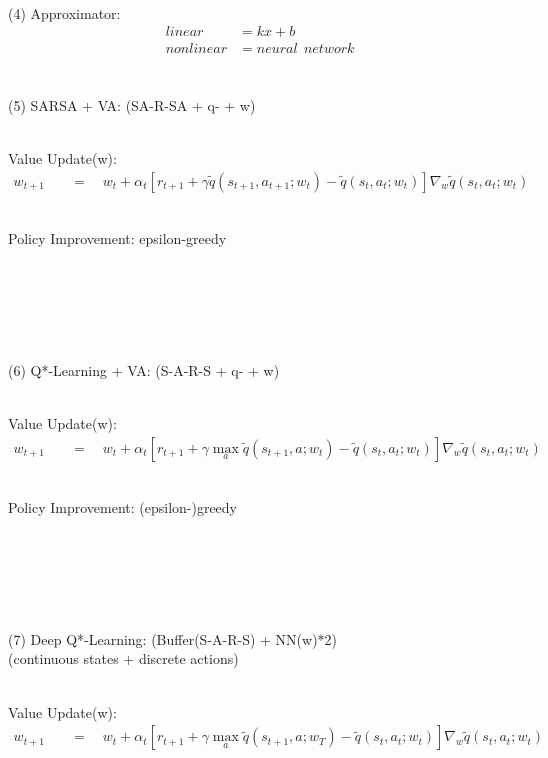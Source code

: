 \documentclass{article}
\begin{document}
~ \\[3pt]
(4) Approximator: 
\begin{align*}
    linear    &= kx + b \\[3pt]
    nonlinear &= neural \ \ network \\[3pt]
\end{align*}


\newpage


~ \\[3pt]
(5) SARSA + VA: \qquad (SA-R-SA + q- + w) 

~ \\[3pt]
Value Update(w): 
\begin{align*}
    w_{t+1} & 
            \quad = \quad w_{t} + \alpha_{t} 
            [ r_{t+1} + \gamma \tilde{q}(s_{t+1}, a_{t+1}; w_{t}) 
            - \tilde{q}(s_{t}, a_{t}; w_{t}) ] 
            \nabla_{w} \tilde{q}(s_{t}, a_{t}; w_{t}) 
\end{align*}

~ \\[3pt]
Policy Improvement: epsilon-greedy


~ \\[3pt]
~ \\[3pt]
~ \\[3pt]
~ \\[3pt]
~ \\[3pt]
(6) Q*-Learning + VA: \qquad (S-A-R-S + q- + w) 

~ \\[3pt]
Value Update(w): 
\begin{align*}
    w_{t+1} & 
            \quad = \quad w_{t} + \alpha_{t} 
            [ r_{t+1} + \gamma \max_{a} \tilde{q}(s_{t+1}, a; w_{t}) 
            - \tilde{q}(s_{t}, a_{t}; w_{t}) ] 
            \nabla_{w} \tilde{q}(s_{t}, a_{t}; w_{t}) 
\end{align*}

~ \\[3pt]
Policy Improvement: (epsilon-)greedy 


~ \\[3pt]
~ \\[3pt]
~ \\[3pt]
~ \\[3pt]
~ \\[3pt]
(7) Deep Q*-Learning: \qquad (Buffer(S-A-R-S) + NN(w)*2) \\[3pt]
\quad (continuous states + discrete actions)

~ \\[3pt]
Value Update(w): 
\begin{align*}
    w_{t+1} & 
            \quad = \quad w_{t} + \alpha_{t} 
            [ r_{t+1} + \gamma \max_{a} \tilde{q}(s_{t+1}, a; w_{T}) 
            - \tilde{q}(s_{t}, a_{t}; w_{t}) ] 
            \nabla_{w} \tilde{q}(s_{t}, a_{t}; w_{t}) 
\end{align*}
\end{document}
